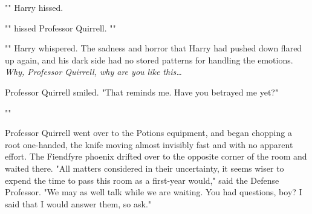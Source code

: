 "" Harry hissed.

"" hissed Professor Quirrell. 
""

"" Harry whispered. The sadness and horror that Harry had pushed 
down flared up again, and his dark side had no stored patterns for handling the 
emotions. \emph{Why, Professor Quirrell, why are you like this{\ldots}}

Professor Quirrell smiled. "That reminds me. Have you betrayed me yet?"

""

Professor Quirrell went over to the Potions equipment, and began chopping a 
root one-handed, the knife moving almost invisibly fast and with no apparent 
effort. The Fiendfyre phoenix drifted over to the opposite corner of the room 
and waited there. "All matters considered in their uncertainty, it seems wiser 
to expend the time to pass this room as a first-year would," said the Defense 
Professor. "We may as well talk while we are waiting. You had questions, boy? I 
said that I would answer them, so ask."
